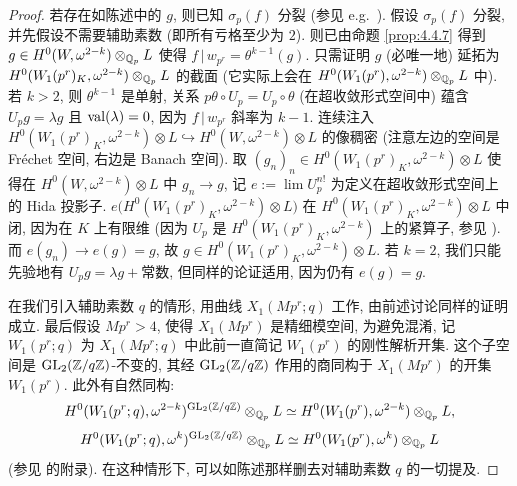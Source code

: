 \begin{proof}
若存在如陈述中的 $g$, 则已知 $\sigma_p(f)$ 分裂 (参见 e.g.\ \cite[Prop.~11]{ref:30}).
假设 $\sigma_p(f)$ 分裂, 并先假设不需要辅助素数 (即所有亏格至少为 $2$).
则已由命题 \ref{prop:4.4.7} 得到 $g \in H^{0}(W,\omega^{2-k}) \otimes_{\mathbb{Q}_p} L$ 使得 $f\,|\,w_{p^{r}} = \theta^{k-1}(g)$.
只需证明 $g$ (必唯一地) 延拓为 $H^{0}(W_1(p^{r})_K,\omega^{2-k}) \otimes_{\mathbb{Q}_p} L$ 的截面 (它实际上会在 $H^{0}(W_1(p^{r}),\omega^{2-k}) \otimes_{\mathbb{Q}_p} L$ 中).
若 $k > 2$, 则 $\theta^{k-1}$ 是单射, 关系 $p\theta \circ U_p = U_p \circ \theta$ (在超收敛形式空间中) 蕴含 $U_p g = \lambda g$ 且 $\operatorname{val}(\lambda) = 0$, 因为 $f\,|\,w_{p^{r}}$ 斜率为 $k-1$.
连续注入 $H^{0}(W_1(p^{r})_K,\omega^{2-k}) \otimes L \hookrightarrow H^{0}(W,\omega^{2-k}) \otimes L$ 的像稠密 (注意左边的空间是 Fr\'echet 空间, 右边是 Banach 空间).
取 $(g_n)_n \in H^{0}(W_1(p^{r})_K,\omega^{2-k}) \otimes L$ 使得在 $H^{0}(W,\omega^{2-k}) \otimes L$ 中 $g_n \to g$, 记 $e := \lim U_p^{n!}$ 为定义在超收敛形式空间上的 Hida 投影子.
$e\bigl(H^{0}(W_1(p^{r})_K,\omega^{2-k}) \otimes L\bigr)$ 在 $H^{0}(W_1(p^{r})_K,\omega^{2-k}) \otimes L$ 中闭, 因为在 $K$ 上有限维 (因为 $U_p$ 是 $H^{0}(W_1(p^{r})_K,\omega^{2-k})$ 上的紧算子, 参见 \cite{ref:14}).
而 $e(g_n) \to e(g) = g$, 故 $g \in H^{0}(W_1(p^{r})_K,\omega^{2-k}) \otimes L$.
若 $k = 2$, 我们只能先验地有 $U_p g = \lambda g + \text{常数}$, 但同样的论证适用, 因为仍有 $e(g) = g$.

在我们引入辅助素数 $q$ 的情形, 用曲线 $X_1(Mp^{r};q)$ 工作, 由前述讨论同样的证明成立.
最后假设 $Mp^{r} > 4$, 使得 $X_1(Mp^{r})$ 是精细模空间, 为避免混淆, 记 $W_1(p^{r};q)$ 为 $X_1(Mp^{r};q)$ 中此前一直简记 $W_1(p^{r})$ 的刚性解析开集.
这个子空间是 $\mathrm{GL}_2(\mathbb{Z}/q\mathbb{Z})$-不变的, 其经 $\mathrm{GL}_2(\mathbb{Z}/q\mathbb{Z})$ 作用的商同构于 $X_1(Mp^{r})$ 的开集 $W_1(p^{r})$.
此外有自然同构:
\[
H^{0}(W_1(p^{r};q),\omega^{2-k})^{\mathrm{GL}_2(\mathbb{Z}/q\mathbb{Z})} \otimes_{\mathbb{Q}_p} L \simeq H^{0}(W_1(p^{r}),\omega^{2-k}) \otimes_{\mathbb{Q}_p} L,
\]
\[
H^{0}(W_1(p^{r};q),\omega^{k})^{\mathrm{GL}_2(\mathbb{Z}/q\mathbb{Z})} \otimes_{\mathbb{Q}_p} L \simeq H^{0}(W_1(p^{r}),\omega^{k}) \otimes_{\mathbb{Q}_p} L
\]
(参见 \cite{ref:10} 的附录).
在这种情形下, 可以如陈述那样删去对辅助素数 $q$ 的一切提及.
\end{proof}
